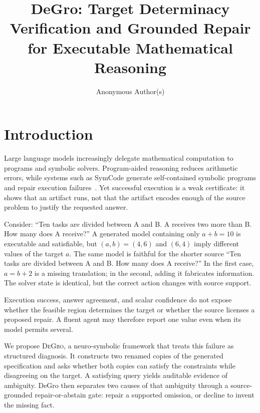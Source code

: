 \documentclass[sigconf,anonymous]{aamas}
\title{DeGro: Target Determinacy Verification and Grounded Repair for Executable Mathematical Reasoning}
\author{Anonymous Author(s)}
\newcommand{\method}{\textsc{DeGro}}
\begin{document}
\maketitle

\section{Introduction}
Large language models increasingly delegate mathematical computation to programs and symbolic solvers.  Program-aided reasoning reduces arithmetic errors, while systems such as SymCode generate self-contained symbolic programs and repair execution failures~\cite{gao2023pal,nezhad2026symcode}.  Yet successful execution is a weak certificate: it shows that an artifact runs, not that the artifact encodes enough of the source problem to justify the requested answer.

Consider: ``Ten tasks are divided between A and B. A receives two more than B. How many does A receive?''  A generated model containing only $a+b=10$ is executable and satisfiable, but $(a,b)=(4,6)$ and $(6,4)$ imply different values of the target $a$.  The same model is faithful for the shorter source ``Ten tasks are divided between A and B. How many does A receive?''  In the first case, $a=b+2$ is a missing translation; in the second, adding it fabricates information.  The solver state is identical, but the correct action changes with source support.

Execution success, answer agreement, and scalar confidence do not expose whether the feasible region determines the target or whether the source licenses a proposed repair.  A fluent agent may therefore report one value even when its model permits several.

We propose \method{}, a neuro-symbolic framework that treats this failure as structured diagnosis.  It constructs two renamed copies of the generated specification and asks whether both copies can satisfy the constraints while disagreeing on the target.  A satisfying query yields auditable evidence of ambiguity.  DeGro then separates two causes of that ambiguity through a source-grounded repair-or-abstain gate: repair a supported omission, or decline to invent the missing fact.
\end{document}
